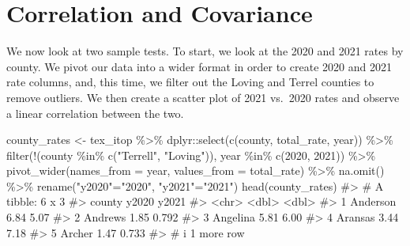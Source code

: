\documentclass[
  letterpaper,
]{krantz}
\makeatletter
\newenvironment{Shaded}{\begin{snugshade}}{\end{snugshade}}
\newcommand{\AttributeTok}[1]{\textcolor[rgb]{0.40,0.45,0.13}{#1}}
\newcommand{\CommentTok}[1]{\textcolor[rgb]{0.37,0.37,0.37}{#1}}
\newcommand{\DecValTok}[1]{\textcolor[rgb]{0.68,0.00,0.00}{#1}}
\newcommand{\FunctionTok}[1]{\textcolor[rgb]{0.28,0.35,0.67}{#1}}
\newcommand{\NormalTok}[1]{\textcolor[rgb]{0.00,0.23,0.31}{#1}}
\newcommand{\OtherTok}[1]{\textcolor[rgb]{0.00,0.23,0.31}{#1}}
\newcommand{\SpecialCharTok}[1]{\textcolor[rgb]{0.37,0.37,0.37}{#1}}
\newcommand{\StringTok}[1]{\textcolor[rgb]{0.13,0.47,0.30}{#1}}
\newenvironment{kframe}{%
\medskip{}
\setlength{\fboxsep}{.8em}
 \def\at@end@of@kframe{}%
 \ifinner\ifhmode%
  \def\at@end@of@kframe{\end{minipage}}%
  \begin{minipage}{\columnwidth}%
 \fi\fi%
 \def\FrameCommand##1{\hskip\@totalleftmargin \hskip-\fboxsep
 \colorbox{shadecolor}{##1}\hskip-\fboxsep
     \hskip-\linewidth \hskip-\@totalleftmargin \hskip\columnwidth}%
 \MakeFramed {\advance\hsize-\width
   \@totalleftmargin\z@ \linewidth\hsize
   \@setminipage}}%
 {\par\unskip\endMakeFramed%
 \at@end@of@kframe}
\renewenvironment{Shaded}{\begin{kframe}}{\end{kframe}}
\makeatother
\begin{document}
\hypertarget{correlation-and-covariance}{%
\section{Correlation and Covariance}\label{correlation-and-covariance}}

We now look at two sample tests. To start, we look at the 2020 and 2021
rates by county. We pivot our data into a wider format in order to
create 2020 and 2021 rate columns, and, this time, we filter out the
Loving and Terrel counties to remove outliers. We then create a scatter
plot of 2021 vs.~2020 rates and observe a linear correlation between the
two.

\begin{Shaded}
\begin{Highlighting}[]
\NormalTok{county\_rates }\OtherTok{\textless{}{-}}\NormalTok{ tex\_itop }\SpecialCharTok{\%\textgreater{}\%}
\NormalTok{  dplyr}\SpecialCharTok{::}\FunctionTok{select}\NormalTok{(}\FunctionTok{c}\NormalTok{(county, total\_rate, year)) }\SpecialCharTok{\%\textgreater{}\%}
  \FunctionTok{filter}\NormalTok{(}\SpecialCharTok{!}\NormalTok{(county }\SpecialCharTok{\%in\%} \FunctionTok{c}\NormalTok{(}\StringTok{"Terrell"}\NormalTok{, }\StringTok{"Loving"}\NormalTok{)), }
\NormalTok{         year }\SpecialCharTok{\%in\%} \FunctionTok{c}\NormalTok{(}\DecValTok{2020}\NormalTok{, }\DecValTok{2021}\NormalTok{)) }\SpecialCharTok{\%\textgreater{}\%}
  \FunctionTok{pivot\_wider}\NormalTok{(}\AttributeTok{names\_from =}\NormalTok{ year, }\AttributeTok{values\_from =}\NormalTok{ total\_rate) }\SpecialCharTok{\%\textgreater{}\%}
  \FunctionTok{na.omit}\NormalTok{() }\SpecialCharTok{\%\textgreater{}\%}
  \FunctionTok{rename}\NormalTok{(}\StringTok{"y2020"}\OtherTok{=}\StringTok{"2020"}\NormalTok{, }\StringTok{"y2021"}\OtherTok{=}\StringTok{"2021"}\NormalTok{)}
\FunctionTok{head}\NormalTok{(county\_rates)}
\CommentTok{\#\textgreater{} \# A tibble: 6 x 3}
\CommentTok{\#\textgreater{}   county   y2020 y2021}
\CommentTok{\#\textgreater{}   \textless{}chr\textgreater{}    \textless{}dbl\textgreater{} \textless{}dbl\textgreater{}}
\CommentTok{\#\textgreater{} 1 Anderson  6.84 5.07 }
\CommentTok{\#\textgreater{} 2 Andrews   1.85 0.792}
\CommentTok{\#\textgreater{} 3 Angelina  5.81 6.00 }
\CommentTok{\#\textgreater{} 4 Aransas   3.44 7.18 }
\CommentTok{\#\textgreater{} 5 Archer    1.47 0.733}
\CommentTok{\#\textgreater{} \# i 1 more row}
\end{Highlighting}
\end{Shaded}
\end{document}
